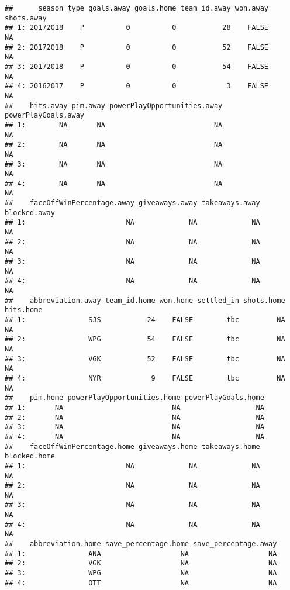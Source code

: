 \documentclass[
]{article}
\newenvironment{Shaded}{\begin{snugshade}}{\end{snugshade}}
\newcommand{\FunctionTok}[1]{\textcolor[rgb]{0.00,0.00,0.00}{#1}}
\newcommand{\NormalTok}[1]{#1}
\newcommand{\SpecialCharTok}[1]{\textcolor[rgb]{0.00,0.00,0.00}{#1}}
\begin{document}
\begin{Shaded}
\end{Shaded}

\begin{verbatim}
##      season type goals.away goals.home team_id.away won.away shots.away
## 1: 20172018    P          0          0           28    FALSE         NA
## 2: 20172018    P          0          0           52    FALSE         NA
## 3: 20172018    P          0          0           54    FALSE         NA
## 4: 20162017    P          0          0            3    FALSE         NA
##    hits.away pim.away powerPlayOpportunities.away powerPlayGoals.away
## 1:        NA       NA                          NA                  NA
## 2:        NA       NA                          NA                  NA
## 3:        NA       NA                          NA                  NA
## 4:        NA       NA                          NA                  NA
##    faceOffWinPercentage.away giveaways.away takeaways.away blocked.away
## 1:                        NA             NA             NA           NA
## 2:                        NA             NA             NA           NA
## 3:                        NA             NA             NA           NA
## 4:                        NA             NA             NA           NA
##    abbreviation.away team_id.home won.home settled_in shots.home hits.home
## 1:               SJS           24    FALSE        tbc         NA        NA
## 2:               WPG           54    FALSE        tbc         NA        NA
## 3:               VGK           52    FALSE        tbc         NA        NA
## 4:               NYR            9    FALSE        tbc         NA        NA
##    pim.home powerPlayOpportunities.home powerPlayGoals.home
## 1:       NA                          NA                  NA
## 2:       NA                          NA                  NA
## 3:       NA                          NA                  NA
## 4:       NA                          NA                  NA
##    faceOffWinPercentage.home giveaways.home takeaways.home blocked.home
## 1:                        NA             NA             NA           NA
## 2:                        NA             NA             NA           NA
## 3:                        NA             NA             NA           NA
## 4:                        NA             NA             NA           NA
##    abbreviation.home save_percentage.home save_percentage.away
## 1:               ANA                   NA                   NA
## 2:               VGK                   NA                   NA
## 3:               WPG                   NA                   NA
## 4:               OTT                   NA                   NA
\end{verbatim}
\end{document}
